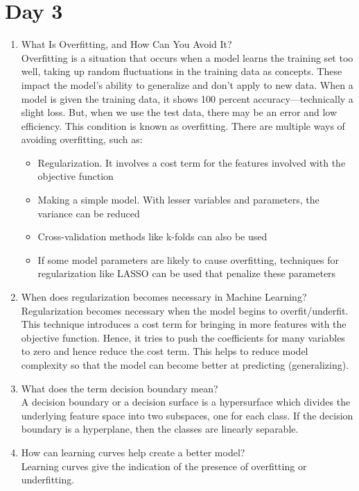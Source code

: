 \documentclass[11pt]{article}
\begin{document}
\section{Day 3}
\begin{enumerate}
\item What Is Overfitting, and How Can You Avoid It?\\[.5em]
Overfitting is a situation that occurs when a model learns the training set too well, taking up
random fluctuations in the training data as concepts. These impact the model's ability to
generalize and don’t apply to new data.
When a model is given the training data, it shows 100 percent accuracy—technically a slight
loss. But, when we use the test data, there may be an error and low efficiency. This condition is
known as overfitting.
There are multiple ways of avoiding overfitting, such as:
\begin{itemize}
\item Regularization. It involves a cost term for the features involved with the objective function
\item Making a simple model. With lesser variables and parameters, the variance can be
reduced
\item Cross-validation methods like k-folds can also be used
\item If some model parameters are likely to cause overfitting, techniques for regularization
like LASSO can be used that penalize these parameters
\end{itemize}

\item When does regularization becomes necessary in Machine Learning?\\[.5em]
Regularization becomes necessary when the model begins to overfit/underfit. This technique
introduces a cost term for bringing in more features with the objective function. Hence, it tries to
push the coefficients for many variables to zero and hence reduce the cost term. This helps to
reduce model complexity so that the model can become better at predicting (generalizing).

\item What does the term decision boundary mean?\\[.5em]
A decision boundary or a decision surface is a hypersurface which divides the
underlying feature space into two subspaces, one for each class. If the decision boundary is a
hyperplane, then the classes are linearly separable.

\item How can learning curves help create a better model?\\[.5em]
Learning curves give the indication of the presence of overfitting or underfitting.


\end{enumerate}
\end{document}
